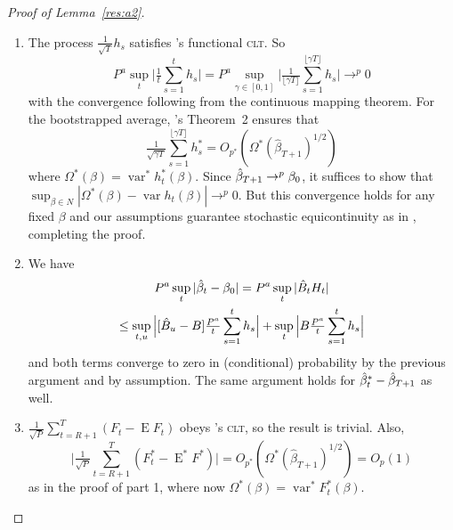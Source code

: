 \documentclass[11pt,fleqn]{article}
\newcommand\citepos[2][]{\citeauthor{#2}'s \citeyearpar[#1]{#2}}
\theoremstyle{definition}
\DeclareMathOperator{\E}{E}
\DeclareMathOperator{\var}{var}
\newcommand{\btrue}[1][]{\if#1*\hat\beta_{T+1}\else\beta_0\fi}
\newcommand{\clt}{\textsc{clt}}
\begin{document}
\begin{proof}[Proof of Lemma~\ref{res:a2}]
  \begin{enumerate}
  \item The process $\tfrac{1}{\sqrt{T}} h_{s}$ satisfies
    \citepos[Theorem 3.1]{JoD:00b} functional \clt.  So
    \begin{equation}
      P^a \sup_t \Big| \tfrac1t \sum_{s=1}^t h_{s} \Big| =
      P^a \sup_{\gamma \in [0,1]} \Big| \tfrac{1}{\lfloor \gamma
        T\rfloor} \sum_{s=1}^{\lfloor \gamma T \rfloor} h_{s} \Big| \to^{p} 0
    \end{equation}
    with the convergence following from the continuous mapping
    theorem.  For the bootstrapped average, \citepos{Cal:13}
    Theorem~2 ensures that
    \begin{equation}
      \tfrac{1}{\sqrt{\gamma
          T}} \sum_{s=1}^{\lfloor \gamma T \rfloor} h_{s}^*
      = O_{p^*}(\Omega^*(\hat\beta_{T+1})^{1/2})
    \end{equation}
    where $\Omega^*(\beta) = \var^* h_t^*(\beta)$.  Since
    $\hat\beta_{T+1} \to^p \btrue$, it suffices to show that
    $\sup_{\beta \in N} | \Omega^*(\beta) - \var h_t(\beta) | \to^p
    0$.  But this convergence holds for any fixed $\beta$ and our
    assumptions guarantee stochastic equicontinuity as in
    \citet{JoD:00} \citep[also see][]{Dav:94}, completing the proof.

  \item We have
    \begin{multline}
      P^a \sup_t | \hat{\beta}_t - \btrue | = P^a \sup_t |\hat{B}_{t}
      H_{t}| \\ \leq \sup_{t,u} \Big| [ \hat{B}_u - B]
      \tfrac{P^a}{t} \sum_{s=1}^t h_{s} \Big| + \sup_{t} \Big|
      B \tfrac{P^a}{t} \sum_{s=1}^t h_{s} \Big|
    \end{multline}
    and both terms converge to zero in (conditional) probability by
    the previous argument and by assumption.  The same argument holds
    for $\hat{\beta}_t^{*} - \btrue[*]$ as well.
  \item $\tfrac{1}{\sqrt{P}} \sum_{t=R+1}^T (F_t - \E F_t)$ obeys
    \citepos{Jon:97} \clt, so the result is trivial.  Also,
   \begin{equation}
     \Big\lvert\tfrac{1}{\sqrt{P}} \sum_{t=R+1}^T 
     ( F_t^* - \E^* F^*)\Big\rvert = O_{p^*}(\Omega^*(\hat\beta_{T+1})^{1/2}) = O_p(1)
    \end{equation}
    as in the proof of part 1, where now $\Omega^*(\beta) = \var^* F_t^*(\beta)$.
  \end{enumerate}
\end{proof}
\end{document}
